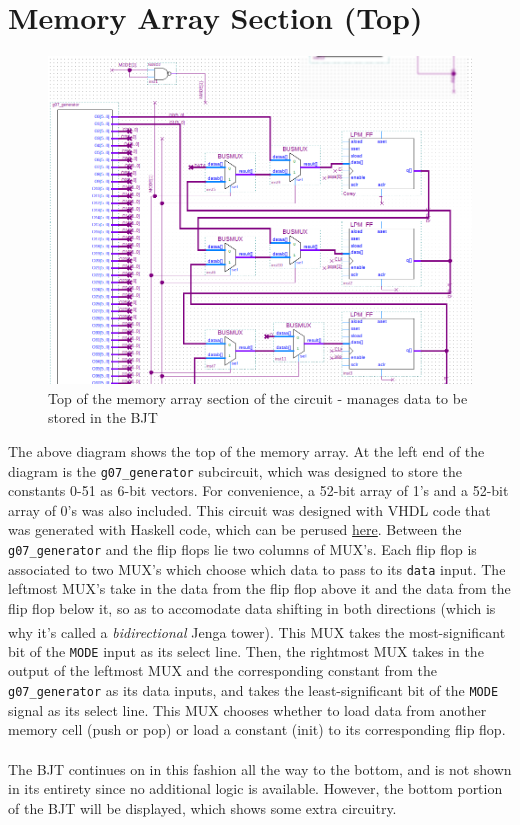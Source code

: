 \documentclass[12pt]{report}
\begin{document}
\section*{Memory Array Section (Top)}
\begin{figure}[h]
	\begin{center}
		\caption{Top of the memory array section of the circuit - manages data to be stored in the
		BJT}
		\includegraphics[scale=0.55]{Lab3/stack_array1}
	\end{center}
\end{figure}
The above diagram shows the top of the memory array. At the left end of the diagram is the
\texttt{g07\_generator} subcircuit, which was designed to store the constants 0-51 as 6-bit vectors.
For convenience, a 52-bit array of 1's and a 52-bit array of 0's was also included. This circuit was
designed with VHDL code that was generated with Haskell code, which can be perused 
\hyperref[app:hs]{here}.
Between the \texttt{g07\_generator} and the flip flops lie two columns of MUX's. Each flip flop is
associated to two MUX's which choose which data to pass to its \texttt{data} input. The leftmost
MUX's take in the data from the flip flop above it and the data from the flip flop below it, so as
to accomodate data shifting in both directions (which is why it's called a \textit{bidirectional}
Jenga\textsuperscript{\textregistered} tower). This MUX takes the most-significant bit of the
\texttt{MODE} input as its select line. Then, the rightmost MUX takes in the output of the leftmost
MUX and the corresponding constant from the \texttt{g07\_generator} as its data inputs, and takes
the least-significant bit of the \texttt{MODE} signal as its select line. This MUX chooses whether
to load data from another memory cell (push or pop) or load a constant (init) to its corresponding
flip flop.\\\\
The BJT continues on in this fashion all the way to the bottom, and is not shown in its entirety
since no additional logic is available. However, the bottom portion of the BJT will be displayed,
which shows some extra circuitry.
\end{document}
